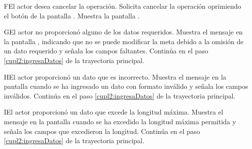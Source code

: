 \begin{UCtrayectoriaA}{F}{El actor desea cancelar la operación.}
	\UCpaso[\UCactor] Solicita cancelar la operación oprimiendo el botón  de la pantalla .
	\UCpaso[\UCsist] Muestra la pantalla  .
\end{UCtrayectoriaA} 

\begin{UCtrayectoriaA}{G}{El actor no proporcionó alguno de los datos requeridos.}
	\UCpaso[\UCsist] Muestra el mensaje  en la pantalla  ,
	indicando que no se puede modificar la meta debido a la omisión de un dato requerido y señala los campos faltantes.
	\UCpaso[] Continúa en el paso \ref{cupl2:ingresaDatos} de la trayectoria principal.
\end{UCtrayectoriaA}
 
\begin{UCtrayectoriaA}{H}{El actor proporcionó un dato que es incorrecto.}
	\UCpaso[\UCsist] Muestra el mensaje  en la pantalla 
	cuando se ha ingresado un dato con formato inválido y señala los campos inválidos.
	\UCpaso[] Continúa en el paso \ref{cupl2:ingresaDatos} de la trayectoria principal.
\end{UCtrayectoriaA}

\begin{UCtrayectoriaA}{I}{El actor proporcionó un dato que excede la longitud máxima.}
	\UCpaso[\UCsist] Muestra el mensaje  en la pantalla 
	cuando se ha excedido la longitud máxima permitida y señala los campos que excedieron la longitud.
	\UCpaso[] Continúa en el paso \ref{cupl2:ingresaDatos} de la trayectoria principal.
\end{UCtrayectoriaA}